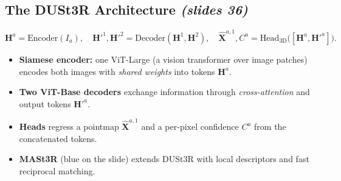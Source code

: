 \documentclass[11pt,a4paper]{article}
\newcommand{\slr}[1]{\texorpdfstring{\emph{(slides #1)}}{(slides #1)}}
\newcommand{\Xhat}{\hat{\bm{X}}}
\theoremstyle{definition}
\theoremstyle{plain}
\theoremstyle{remark}
\begin{document}
\subsection{The DUSt3R Architecture \slr{36}}
\[ \bm H^a=\mathrm{Encoder}(I_a),\quad \bm H'^1,\bm H'^2=\mathrm{Decoder}(\bm H^1,\bm H^2),\quad \Xhat^{a,1},C^a=\mathrm{Head}_{\mathrm{3D}}\bigl([\bm H^a,\bm H'^a]\bigr). \]
\begin{itemize}
\item \textbf{Siamese encoder:} one ViT-Large (a vision transformer over image patches) encodes both images with \emph{shared weights} into tokens $\bm H^a$.
\item \textbf{Two ViT-Base decoders} exchange information through \emph{cross-attention} and output tokens $\bm H'^a$.
\item \textbf{Heads} regress a pointmap $\Xhat^{a,1}$ and a per-pixel confidence $C^a$ from the concatenated tokens.
\item \textbf{MASt3R} (blue on the slide) extends DUSt3R with local descriptors and fast reciprocal matching.
\end{itemize}
\end{document}
